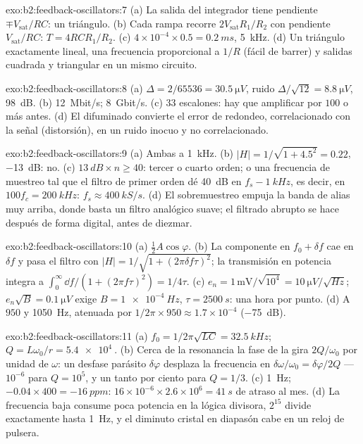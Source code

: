 \begin{solution}{exo:b2:feedback-oscillators:7}
(a) La salida del integrador tiene pendiente $\mp V_{\text{sat}}/RC$: un triángulo. (b)
Cada rampa recorre $2V_{\text{sat}}R_1/R_2$ con pendiente $V_{\text{sat}}/RC$: $T = 4RCR_1/R_2$.
(c) $4 \times 10^{-4} \times 0.5 = \qty{0.2}{ms}$, \qty{5}{kHz}. (d) Un triángulo
exactamente lineal, una frecuencia proporcional a $1/R$ (fácil de barrer)
y salidas cuadrada y triangular en un mismo circuito.
\end{solution}

\begin{solution}{exo:b2:feedback-oscillators:8}
(a) $\Delta = 2/65536 = \qty{30.5}{\micro V}$, ruido $\Delta/\sqrt{12} = \qty{8.8}{\micro V}$,
\qty{98}{dB}. (b) \qty{12}{Mbit/s}; \qty{8}{Gbit/s}. (c) $33$ escalones: hay que
amplificar por $100$ o más antes. (d) El difuminado convierte el error de
redondeo, correlacionado con la señal (distorsión), en un ruido inocuo y
no correlacionado.
\end{solution}

\begin{solution}{exo:b2:feedback-oscillators:9}
(a) Ambas a \qty{1}{kHz}. (b) $|H| = 1/\sqrt{1 + 4.5^2} = 0.22$, \qty{-13}{dB}: no. (c)
$\qty{13}{dB} \times n \ge 40$: tercer o cuarto orden; o una frecuencia de muestreo
tal que el filtro de primer orden dé \qty{40}{dB} en $f_s - \qty{1}{kHz}$, es decir, en
$100f_c = \qty{200}{kHz}$: $f_s \approx \qty{400}{kS/s}$. (d) El sobremuestreo empuja la
banda de alias muy arriba, donde basta un filtro analógico suave; el
filtrado abrupto se hace después de forma digital, antes de diezmar.
\end{solution}

\begin{solution}{exo:b2:feedback-oscillators:10}
(a) $\tfrac12A\cos\varphi$. (b) La componente en $f_0 + \delta f$ cae en $\delta f$
y pasa el filtro con $|H| = 1/\sqrt{1 + (2\pi\delta f\tau)^2}$; la transmisión
en potencia integra a $\int_0^\infty\dd f/(1 + (2\pi f\tau)^2) = 1/4\tau$.
(c) $e_n = 1\,\text{mV}/\sqrt{10^4} = \qty{10}{\micro V/\sqrt{Hz}}$; $e_n\sqrt B = \qty{0.1}{\micro V}$
exige $B = \qty{1e-4}{Hz}$, $\tau = \qty{2500}{s}$: una hora por punto. (d) A $950$
y \qty{1050}{Hz}, atenuada por $1/2\pi \times 950 \approx 1.7 \times 10^{-4}$ (\qty{-75}{dB}).
\end{solution}

\begin{solution}{exo:b2:feedback-oscillators:11}
(a) $f_0 = 1/2\pi\sqrt{LC} = \qty{32.5}{kHz}$; $Q = L\omega_0/r = \qty{5.4e4}{}$. (b) Cerca
de la resonancia la fase de la  gira $2Q/\omega_0$ por unidad de $\omega$: un
desfase parásito $\delta\varphi$ desplaza la frecuencia en $\delta\omega/\omega_0 =
\delta\varphi/2Q$ --- $10^{-6}$ para $Q = 10^5$, y un tanto por ciento para $Q = 1/3$. (c) \qty{1}{Hz};
$-0.04 \times 400 = \qty{-16}{ppm}$: $16 \times 10^{-6} \times 2.6 \times 10^6 = \qty{41}{s}$ de atraso al
mes. (d) La frecuencia baja consume poca potencia en la lógica divisora, $2^{15}$
divide exactamente hasta \qty{1}{Hz}, y el diminuto cristal en diapasón
cabe en un reloj de pulsera.
\end{solution}

